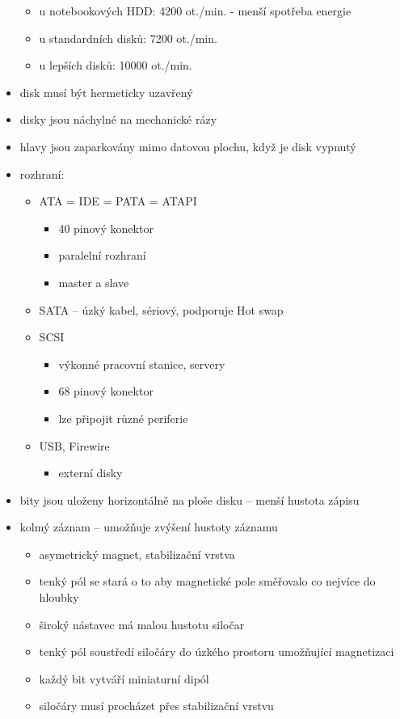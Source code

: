 \documentclass[a4paper,12pt]{article}
\providecommand{\tightlist}{%
\setlength{\itemsep}{0pt}\setlength{\parskip}{0pt}}
\begin{document}
\begin{itemize}
  \begin{itemize}
  \tightlist
  \item u notebookových HDD: 4200 ot./min. - menší spotřeba energie
  \item u standardních disků: 7200 ot./min.
  \item u lepších disků: 10000 ot./min.
  \end{itemize}
\item disk musí být hermeticky uzavřený
\item disky jsou náchylné na mechanické rázy
\item hlavy jsou zaparkovány mimo datovou plochu, když je disk vypnutý
\item rozhraní:

  \begin{itemize}
    \tightlist
  \item ATA = IDE = PATA = ATAPI

    \begin{itemize}
    \tightlist
    \item 40 pinový konektor
    \item paralelní rozhraní
    \item master a slave
    \end{itemize}
  \item SATA -- úzký kabel, sériový, podporuje Hot swap
  \item SCSI

    \begin{itemize}
    \tightlist
    \item výkonné pracovní stanice, servery
    \item 68 pinový konektor
    \item lze připojit různé periferie
    \end{itemize}
  \item USB, Firewire

    \begin{itemize}
    \tightlist
    \item externí disky
    \end{itemize}
  \end{itemize}
\item bity jsou uloženy horizontálně na ploše disku -- menší hustota zápisu
\item kolmý záznam -- umožňuje zvýšení hustoty záznamu

  \begin{itemize}
  \tightlist
  \item asymetrický magnet, stabilizační vrstva
  \item tenký pól se stará o to aby magnetické pole směřovalo co nejvíce do
    hloubky
  \item široký nástavec má malou hustotu siločar
  \item tenký pól soustředí siločáry do úzkého prostoru umožňující
    magnetizaci
  \item každý bit vytváří miniaturní dipól
  \item siločáry musí procházet přes stabilizační vrstvu
  \end{itemize}
\end{itemize}
\end{document}
